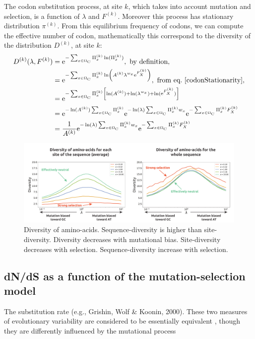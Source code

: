 The codon substitution process, at site $k$, which takes into account mutation and selection, is a function of $\lambda$ and $F^{(k)}$. Moreover this process has stationary distribution $\pi^{(k)}$. From this equilibrium frequency of codons, we can compute the effective number of codon, mathematically this correspond to the diversity of the distribution $D^{(k)}$, at site $k$:
\begin{align}
D^{(k)}(\lambda, F^{(k)})
& =\e^{ - \sum_{x \in \SetCodon}  \Pi_x^{(k)} \ln ( \Pi_x^{(k)} )}, \ \textrm{by definition},\\
& =\e^{ - \sum_{x \in \SetCodon}  \Pi_x^{(k)} \ln \left( A^{(k)} \lambda^{w_x} \e^{F_X^{(k)}} \right)}, \ \textrm{from eq.} \ \ref{codonStationarity},\\
& =\e^{ - \sum_{x \in \SetCodon}  \Pi_x^{(k)} \left[ \ln ( A^{(k)} )+ \ln( \lambda^{w_x} ) + \ln (\e^{F_X^{(k)}}) \right] }\\
& =\e^{ - \ln ( A^{(k)} ) \sum_{x \in \SetCodon}  \Pi_x^{(k)} } \e^{ -  \ln (\lambda) \sum_{x \in \SetCodon}  \Pi_x^{(k)} w_x }\e^{ - \sum_{x \in \SetCodon}  \Pi_x^{(k)} F_X^{(k)}  } \\
& =\frac{1}{A^{(k)}} \e^{ -  \ln (\lambda) \sum_{x \in \SetCodon}  \Pi_x^{(k)} w_x }\e^{ - \sum_{x \in \SetCodon}  \Pi_x^{(k)} F_X^{(k)}  }
\label{entropy}
\end{align}

\begin{figure}[thbp]
	\begin{center}
		\includegraphics[width=\textwidth] {figures/mut-bias-diversity-aa}
	\end{center}
	\caption[Diversity of amino-acids]{Diversity of amino-acids. Sequence-diversity is higher than site-diversity. Diversity decreases with mutational bias.	Site-diversity decreases with selection. Sequence-diversity increase with selection.}
\end{figure}

\subsection{dN/dS as a function of the mutation-selection model}
The substitution rate (e.g., Grishin, Wolf \& Koonin, 2000). These two measures of evolutionary variability are considered to be essentially equivalent \citep{Halpern1998}, though they are differently influenced by the mutational process \citep{Santos2018}

